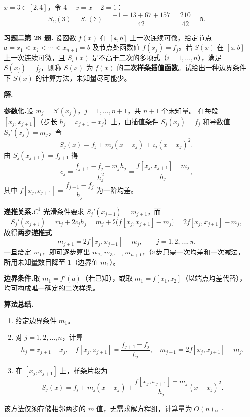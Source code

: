 \documentclass[UTF8,a4paper,11pt]{ctexart}
\newcommand*{\QED}{\hfill\ensuremath{\square}}
\begin{document}
$x=3\in[2,4]$，令 $4-x=x-2=1$：
\[
  S_C(3)=S_1(3)=\frac{-1-13+67+157}{42}=\frac{210}{42}=\boxed{5}.
\]

\bigskip\bigskip

\noindent\textbf{习题二\quad 第 28 题.}\quad
设函数 $f(x)$ 在 $[a,b]$ 上一次连续可微，给定节点 $a=x_1<x_2<\cdots<x_{n+1}=b$ 及节点处函数值 $f(x_j)=f_j$。若 $S(x)$ 在 $[a,b]$ 上一次连续可微，且 $S_i(x)$ 是不高于二次的多项式（$i=1,\ldots,n$），满足 $S(x_j)=f_j$，则称 $S(x)$ 为 $f(x)$ 的\textbf{二次样条插值函数}。试给出一种边界条件下 $S(x)$ 的计算方法，未知量尽可能少。

\medskip
\noindent\textbf{解.}\quad

\noindent\textbf{参数化.}\quad 设 $m_j=S'(x_j)$，$j=1,\ldots,n+1$，共 $n+1$ 个未知量。
在每段 $[x_j,x_{j+1}]$（步长 $h_j=x_{j+1}-x_j$）上，由插值条件 $S_j(x_j)=f_j$ 和导数值 $S_j'(x_j)=m_j$，令
\[
  S_j(x)=f_j+m_j(x-x_j)+c_j(x-x_j)^2,
\]
由 $S_j(x_{j+1})=f_{j+1}$ 得
\[
  c_j=\frac{f_{j+1}-f_j-m_j h_j}{h_j^2}=\frac{f[x_j,x_{j+1}]-m_j}{h_j},
\]
其中 $f[x_j,x_{j+1}]=\dfrac{f_{j+1}-f_j}{h_j}$ 为一阶均差。

\medskip
\noindent\textbf{递推关系.}\quad $C^1$ 光滑条件要求 $S_j'(x_{j+1})=m_{j+1}$，而
\[
  S_j'(x_{j+1})=m_j+2c_j h_j=m_j+2\bigl(f[x_j,x_{j+1}]-m_j\bigr)=2f[x_j,x_{j+1}]-m_j,
\]
故得\textbf{两步递推式}
\[
  \boxed{m_{j+1}=2f[x_j,x_{j+1}]-m_j,\qquad j=1,2,\ldots,n.}
\]
一旦给定 $m_1$，即可逐步算出 $m_2,m_3,\ldots,m_{n+1}$，每步只需一次均差和一次减法，所用未知量数目降至 $1$（边界值 $m_1$）。

\medskip
\noindent\textbf{边界条件.}\quad 取 $m_1=f'(a)$（若已知），或取 $m_1=f[x_1,x_2]$（以端点均差代替），均可构成唯一确定的二次样条。

\medskip
\noindent\textbf{算法总结.}
\begin{enumerate}[label=\arabic*.,leftmargin=*,itemsep=4pt]
  \item 给定边界条件 $m_1$。
  \item 对 $j=1,2,\ldots,n$，计算
        \[
          h_j=x_{j+1}-x_j,\quad
          f[x_j,x_{j+1}]=\frac{f_{j+1}-f_j}{h_j},\quad
          m_{j+1}=2f[x_j,x_{j+1}]-m_j.
        \]
  \item 在 $[x_j,x_{j+1}]$ 上，样条片段为
        \[
          S_j(x)=f_j+m_j(x-x_j)+\frac{f[x_j,x_{j+1}]-m_j}{h_j}(x-x_j)^2.
        \]
\end{enumerate}
该方法仅须存储相邻两步的 $m$ 值，无需求解方程组，计算量为 $O(n)$。\QED

\bigskip\bigskip
\end{document}
